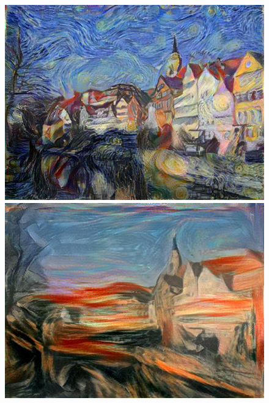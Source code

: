 \documentclass[runningheads]{llncs}
\begin{document}
\begin{figure}[h!]
{\begin{minipage}[b]{0.15\textwidth}
\includegraphics[width=1\textwidth]{neural_style_transfer/img/05_multi_style_output/multi_styles_0-8.jpg} \\
\includegraphics[width=1\textwidth]{neural_style_transfer/img/05_multi_style_output/multi_styles1_0-8.jpg}
\end{minipage}
}
\end{figure}
\end{document}
